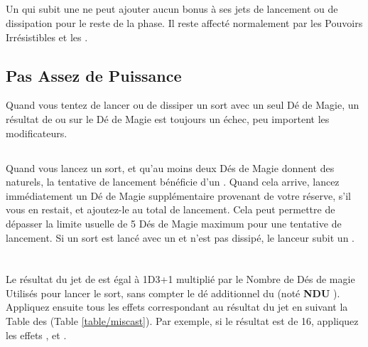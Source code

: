 \hypertarget{lostfocus}{\subsection{\lostfocus}}

Un \wizard{} qui subit une \lostfocus{} ne peut ajouter aucun bonus à ses jets de lancement ou de dissipation pour le reste de la phase. Il reste affecté normalement par les Pouvoirs Irrésistibles et les \miscasts{}.

\subsection{Pas Assez de Puissance}

Quand vous tentez de lancer ou de dissiper un sort avec un seul Dé de Magie, un résultat de  ou  sur le Dé de Magie est toujours un échec, peu importent les modificateurs.

\subsection{\overwhelmingpower}

Quand vous lancez un sort, et qu'au moins deux Dés  de Magie donnent des  naturels, la tentative de lancement bénéficie d'un \overwhelmingpower{}. Quand cela arrive, lancez immédiatement un Dé de Magie supplémentaire provenant de votre réserve, s'il vous en restait, et ajoutez-le au total de lancement. Cela peut permettre de dépasser la limite usuelle de 5 Dés de Magie maximum pour une tentative de lancement. Si un sort est lancé avec un \overwhelmingpower{} et n'est pas dissipé, le lanceur subit un \miscast{}.

\newpage
\hypertarget{miscast}{\section{\miscast}}
\label{miscast}

Le résultat du jet de \miscast{} est égal à 1D3+1 multiplié par le Nombre de Dés de magie Utilisés pour lancer le sort, sans compter le dé additionnel du \overwhelmingpower{} (noté \og \textbf{NDU} \fg{}). Appliquez ensuite tous les effets correspondant au résultat du jet en suivant la Table des \miscasts{} (Table \ref{table/miscast}). Par exemple, si le résultat est de 16, appliquez les effets \witchfire{}, \amnesia{} et \catastrophicdetonation{}.

